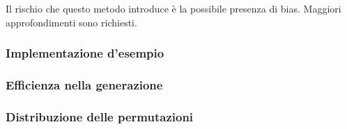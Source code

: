 \documentclass[../../main.tex]{subfiles}
\begin{document}
Il rischio che questo metodo introduce è la possibile presenza di bias.
Maggiori approfondimenti sono richiesti.

\subsubsection{Implementazione d'esempio}


\subsubsection{Efficienza nella generazione}

\subsubsection{Distribuzione delle permutazioni}
\end{document}
